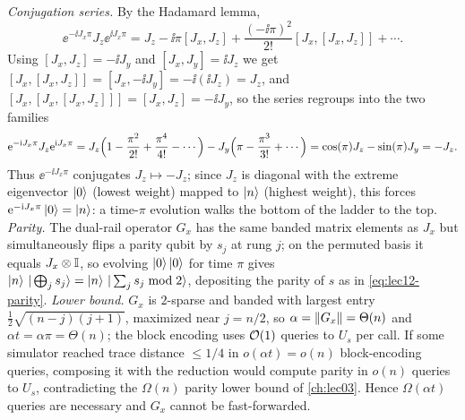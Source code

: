 \begin{solution}
\emph{Conjugation series.} By the Hadamard lemma,
\[
  \ee^{-\ii J_x\pi}J_z\ee^{\ii J_x\pi}
  =J_z-\ii\pi[J_x,J_z]+\frac{(-\ii\pi)^2}{2!}[J_x,[J_x,J_z]]+\cdots.
\]
Using $[J_x,J_z]=-\ii J_y$ and $[J_x,J_y]=\ii J_z$ we get $[J_x,[J_x,J_z]]=[J_x,-\ii J_y]
=-\ii(\ii J_z)=J_z$, and $[J_x,[J_x,[J_x,J_z]]]=[J_x,J_z]=-\ii J_y$, so the series
regroups into the two families
\[
  \mathrm{e}^{-\mathrm{i} J_x\pi}J_z\mathrm{e}^{\mathrm{i} J_x\pi}
  =J_z\Bigl(1-\frac{\pi^2}{2!}+\frac{\pi^4}{4!}-\cdots\Bigr)
   -J_y\Bigl(\pi-\frac{\pi^3}{3!}+\cdots\Bigr)
  =\cos(\pi)J_z-\sin(\pi)J_y=-J_z.
\]
Thus $\ee^{-\ii J_x\pi}$ conjugates $J_z\mapsto-J_z$; since $J_z$ is diagonal with the
extreme eigenvector $\ket0$ (lowest weight) mapped to $\ket n$ (highest weight), this forces
$\mathrm{e}^{-\mathrm{i} J_x\pi}\ket0=\ket n$: a time-$\pi$ evolution walks the bottom of the ladder to the
top. \emph{Parity.} The dual-rail operator $G_x$ has the same banded matrix elements as
$J_x$ but simultaneously flips a parity qubit by $s_j$ at rung $j$; on the permuted basis it
equals $J_x\otimes\mathbb{I}$, so evolving $\ket0\ket0$ for time $\pi$ gives
$\ket n\,|\bigoplus_j s_j\rangle=\ket n\,|\sum_j s_j\bmod2\rangle$, depositing the parity of
$s$ as in \eqref{eq:lec12-parity}. \emph{Lower bound.} $G_x$ is $2$-sparse and banded with
largest entry $\tfrac12\sqrt{(n-j)(j+1)}$, maximized near $j=n/2$, so
$\alpha=\left\lVert G_x \right\rVert=\Theta(n)$ and $\alpha t=\alpha\pi=\Theta(n)$; the block encoding uses
$\mathcal{O}(1)$ queries to $U_s$ per call. If some simulator reached trace distance $\le1/4$ in
$o(\alpha t)=o(n)$ block-encoding queries, composing it with the reduction would compute
parity in $o(n)$ queries to $U_s$, contradicting the $\Omega(n)$ parity lower bound of
\cref{ch:lec03}. Hence $\Omega(\alpha t)$ queries are necessary and $G_x$ cannot be
fast-forwarded.
\end{solution}
